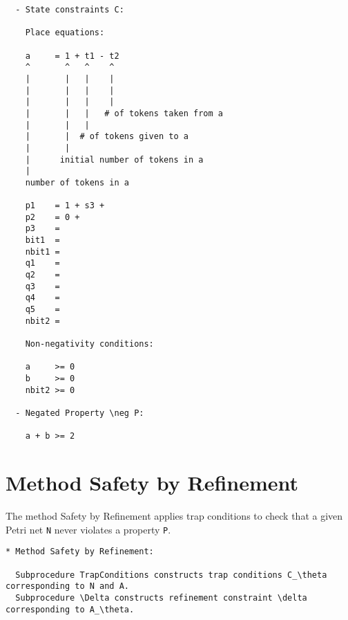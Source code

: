\documentclass{llncs}
\begin{document}
\newpage

\begin{verbatim}
  - State constraints C:

    Place equations:
  
    a     = 1 + t1 - t2
    ^       ^   ^    ^
    |       |   |    |
    |       |   |    |
    |       |   |    |
    |       |   |   # of tokens taken from a
    |       |   |    
    |       |  # of tokens given to a
    |       |
    |      initial number of tokens in a
    |
    number of tokens in a

    p1    = 1 + s3 + 
    p2    = 0 + 
    p3    = 
    bit1  = 
    nbit1 = 
    q1    = 
    q2    = 
    q3    = 
    q4    = 
    q5    = 
    nbit2 = 
    
    Non-negativity conditions:
  
    a     >= 0
    b     >= 0
    nbit2 >= 0

  - Negated Property \neg P:

    a + b >= 2
\end{verbatim}

\newpage

\section{Method Safety by Refinement}

The method Safety by Refinement applies trap conditions to check that a given Petri net \verb=N= never violates a property \verb=P=.

\begin{verbatim}
* Method Safety by Refinement:

  Subprocedure TrapConditions constructs trap conditions C_\theta corresponding to N and A.
  Subprocedure \Delta constructs refinement constraint \delta corresponding to A_\theta.
\end{verbatim}
\end{document}
